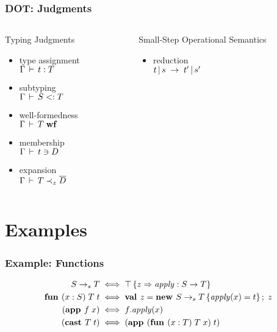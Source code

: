 \documentclass{beamer}
\begin{document}
\begin{frame}[fragile]
\frametitle{DOT: Judgments}
\begin{columns}
\begin{column}[t]{5cm}
\begin{block}{Typing Judgments}
\begin{itemize}
\item type assignment\\$\Gamma \,\vdash\, t : T$
\item subtyping\\$\Gamma \,\vdash\, S <: T$
\item well-formedness\\$\Gamma \,\vdash\, T \;\mbox{\textbf{wf}}$
\item membership\\$\Gamma \,\vdash\, t \ni D$
\item expansion\\$\Gamma \,\vdash\, T \prec_z \overline{D}$
\end{itemize}
\end{block}
\end{column}
\begin{column}[t]{5cm}
\begin{block}{Small-Step Operational Semantics}
\begin{itemize}
\item reduction\\$t \operatorname{|} s \;\rightarrow\; t' \operatorname{|} s'$
\end{itemize}
\end{block}
\end{column}
\end{columns}
\end{frame}

\section{Examples}

\begin{frame}[fragile]
\frametitle{Example: Functions}
\begin{align*}
S\rightarrow_sT &\iff {\top\left\{z \Rightarrow \mathit{apply} : S \rightarrow T \right\}}\\
\textbf{fun } (x:S)\;T\;t &\iff \textbf{val }z = \textbf{new }{S\rightarrow_sT}\left\{\mathit{apply}(x) = t\right\} ;\; z\\
(\textbf{app }f\;x) &\iff f.\mathit{apply}(x)\\
(\textbf{cast }T\;t)&\iff (\textbf{app }(\textbf{fun } (x:T)\;T\;x)\;t)
\end{align*}
\end{frame}
\end{document}
